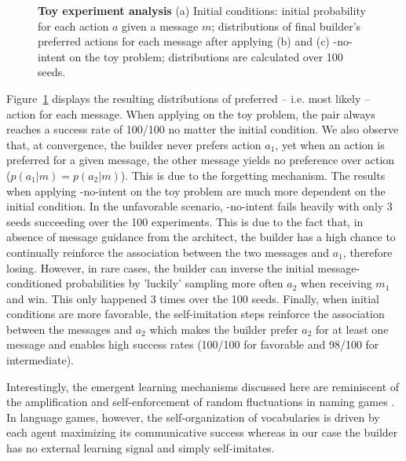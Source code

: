 \begin{figure}[h!]
    \caption{\textbf{Toy experiment analysis} (a) Initial conditions: initial probability for each action $a$ given a message $m$; distributions of final builder's preferred actions for each message after applying (b) \abig and (c) \abig-no-intent on the toy problem; distributions are calculated over 100 seeds.}
    \label{sup:fig_res_toy}
\end{figure}

 Figure~\ref{sup:fig_res_toy} displays the resulting distributions of preferred -- i.e. most likely -- action for each message. When applying \abig on the toy problem, the pair always reaches a success rate of 100/100 no matter the initial condition. We also observe that, at convergence, the builder never prefers action $a_1$, yet when an action is preferred for a given message, the other message yields no preference over action ($p(a_1|m)=p(a_2|m)$). This is due to the forgetting mechanism. The results when applying \abig-no-intent on the toy problem are much more dependent on the initial condition. In the unfavorable scenario, \abig-no-intent fails heavily with only 3 seeds succeeding over the 100 experiments. This is due to the fact that, in absence of message guidance from the architect, the builder has a high chance to continually reinforce the association between the two messages and $a_1$, therefore losing. However, in rare cases, the builder can inverse the initial message-conditioned probabilities by 'luckily' sampling more often $a_2$ when receiving $m_1$ and win. This only happened 3 times over the 100 seeds. Finally, when initial conditions are more favorable, the self-imitation  steps reinforce the association between the messages and $a_2$ which makes the builder prefer $a_2$ for at least one message and enables high success rates (100/100 for favorable and 98/100 for intermediate).

Interestingly, the emergent learning mechanisms discussed here are reminiscent of the amplification and self-enforcement of random fluctuations in naming games \citep{steels1995self}. In language games, however, the self-organization of vocabularies is driven by each agent maximizing its communicative success whereas in our case the builder has no external learning signal and simply self-imitates.

